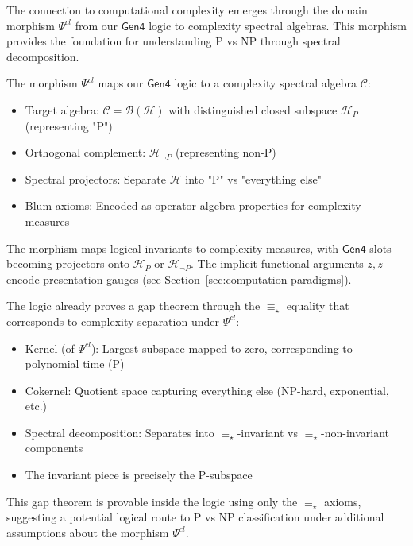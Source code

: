 The connection to computational complexity emerges through the domain morphism $\Psi^{cl}$ from our $\mathsf{Gen4}$ logic to complexity spectral algebras. This morphism provides the foundation for understanding P vs NP through spectral decomposition.

\begin{definition}
\label{def:complexity-spectral-morphism}
The morphism $\Psi^{cl}$ maps our $\mathsf{Gen4}$ logic to a complexity spectral algebra $\mathcal{C}$:
\begin{itemize}
\item Target algebra: $\mathcal{C} = \mathcal{B}(\mathcal{H})$ with distinguished closed subspace $\mathcal{H}_P$ (representing "P")
\item Orthogonal complement: $\mathcal{H}_{\neg P}$ (representing non-P)
\item Spectral projectors: Separate $\mathcal{H}$ into "P" vs "everything else"
\item Blum axioms: Encoded as operator algebra properties for complexity measures
\end{itemize}
The morphism maps logical invariants to complexity measures, with $\mathsf{Gen4}$ slots becoming projectors onto $\mathcal{H}_P$ or $\mathcal{H}_{\neg P}$. The implicit functional arguments $z, \bar{z}$ encode presentation gauges (see Section~\ref{sec:computation-paradigms}).
\end{definition}

\begin{theorem}
\label{thm:gap-theorem-logic}
The logic already proves a gap theorem through the $\equiv_\star$ equality that corresponds to complexity separation under $\Psi^{cl}$:
\begin{itemize}
\item Kernel (of $\Psi^{cl}$): Largest subspace mapped to zero, corresponding to polynomial time (P)
\item Cokernel: Quotient space capturing everything else (NP-hard, exponential, etc.)
\item Spectral decomposition: Separates into $\equiv_\star$-invariant vs $\equiv_\star$-non-invariant components
\item The invariant piece is precisely the P-subspace
\end{itemize}
This gap theorem is provable inside the logic using only the $\equiv_\star$ axioms, suggesting a potential logical route to P vs NP classification under additional assumptions about the morphism $\Psi^{cl}$.
\end{theorem}

